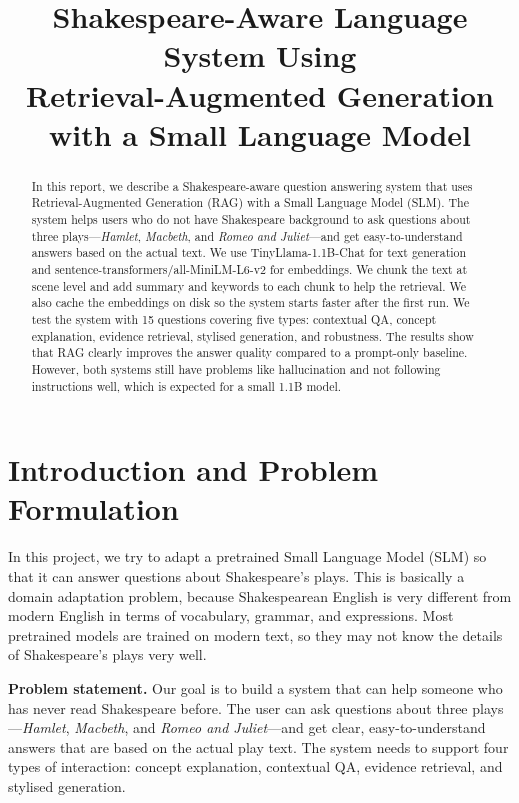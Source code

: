\documentclass[10pt,conference]{IEEEtran}
\title{
Shakespeare-Aware Language System Using\\Retrieval-Augmented Generation with a Small Language Model
}
\author{
\IEEEauthorblockN{
Group Number: \emph{[Insert Group Number]}
}
\IEEEauthorblockA{
CSCI433/933 Machine Learning Algorithms and Applications\\
Student Names and Student Numbers: \emph{[Insert Details]}\\
}
}
\begin{document}
\maketitle


\begin{abstract}
In this report, we describe a Shakespeare-aware question answering system that uses Retrieval-Augmented Generation (RAG) with a Small Language Model (SLM). The system helps users who do not have Shakespeare background to ask questions about three plays---\textit{Hamlet}, \textit{Macbeth}, and \textit{Romeo and Juliet}---and get easy-to-understand answers based on the actual text. We use TinyLlama-1.1B-Chat for text generation and sentence-transformers/all-MiniLM-L6-v2 for embeddings. We chunk the text at scene level and add summary and keywords to each chunk to help the retrieval. We also cache the embeddings on disk so the system starts faster after the first run. We test the system with 15 questions covering five types: contextual QA, concept explanation, evidence retrieval, stylised generation, and robustness. The results show that RAG clearly improves the answer quality compared to a prompt-only baseline. However, both systems still have problems like hallucination and not following instructions well, which is expected for a small 1.1B model.
\end{abstract}

\section{Introduction and Problem Formulation}
\label{sec:introduction}

In this project, we try to adapt a pretrained Small Language Model (SLM) so that it can answer questions about Shakespeare's plays. This is basically a domain adaptation problem, because Shakespearean English is very different from modern English in terms of vocabulary, grammar, and expressions. Most pretrained models are trained on modern text, so they may not know the details of Shakespeare's plays very well.

\textbf{Problem statement.} Our goal is to build a system that can help someone who has never read Shakespeare before. The user can ask questions about three plays---\textit{Hamlet}, \textit{Macbeth}, and \textit{Romeo and Juliet}---and get clear, easy-to-understand answers that are based on the actual play text. The system needs to support four types of interaction: concept explanation, contextual QA, evidence retrieval, and stylised generation.
\end{document}

